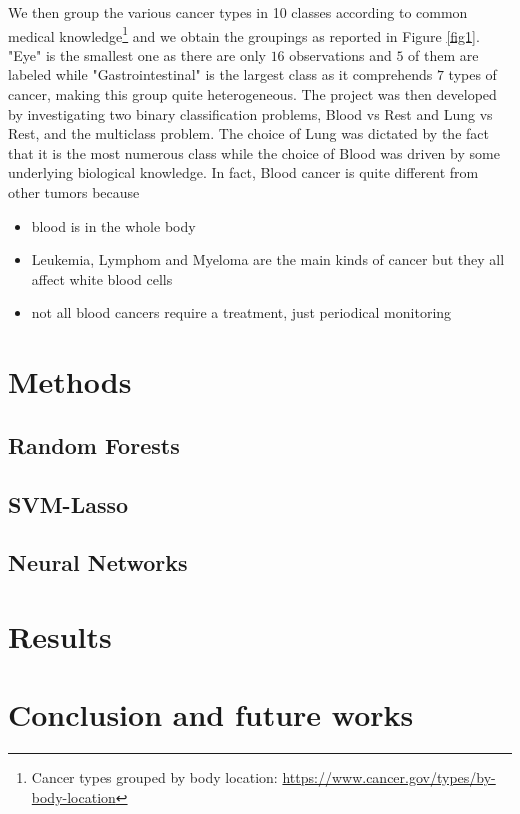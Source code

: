 \documentclass[a4paper,11pt, oneside]{article}  %
\begin{document}
We then group the various cancer types in 10 classes according to common medical knowledge\footnote{Cancer types grouped by body location: \url{https://www.cancer.gov/types/by-body-location}} and we obtain the groupings as reported in Figure \ref{fig1}.  "Eye" is the smallest one as there are only $16$ observations and $5$ of them are labeled while "Gastrointestinal" is the largest class as it comprehends $7$ types of cancer,  making this group quite heterogeneous.  The project was then developed by investigating two binary classification problems,  Blood vs Rest and Lung vs Rest,  and the multiclass problem.  The choice of Lung was dictated by the fact that it is the most numerous class while the choice of Blood was driven by some underlying biological knowledge. In fact,  Blood cancer is quite different from other tumors because
\begin{itemize}
	\item blood is in the whole body
	\item Leukemia, Lymphom and Myeloma are the main kinds of cancer but they all affect white blood cells
	\item not all blood cancers require a treatment, just periodical monitoring
\end{itemize} 


\section{Methods}
\subsection{Random Forests}

\subsection{SVM-Lasso}

\subsection{Neural Networks}


\section{Results}


\section{Conclusion and future works}


\end{document}
